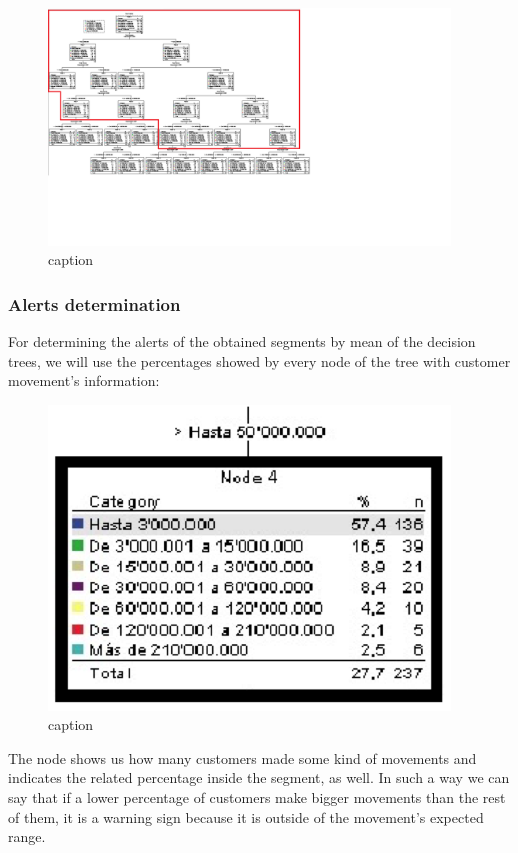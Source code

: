 \begin{figure}[htbp]
  \centering
  \includegraphics[width=0.95\textwidth]{arbolpodado}
  \caption{caption}
  \label{fig:label}
\end{figure}

\subsubsection{Alerts determination}
For determining the alerts of the obtained segments by mean of the decision trees, we will use the percentages showed by every node of the tree with customer movement’s information:

\begin{figure}[htbp]
  \centering
  \includegraphics[width=0.95\textwidth]{Segmentoejemplo}
  \caption{caption}
\end{figure}

The node shows us how many customers made some kind of movements and indicates the related percentage inside the segment, as well.
In such a way we can say that if a lower percentage of customers make bigger movements than the rest of them, it is a warning sign because it is outside of the movement’s expected range.

